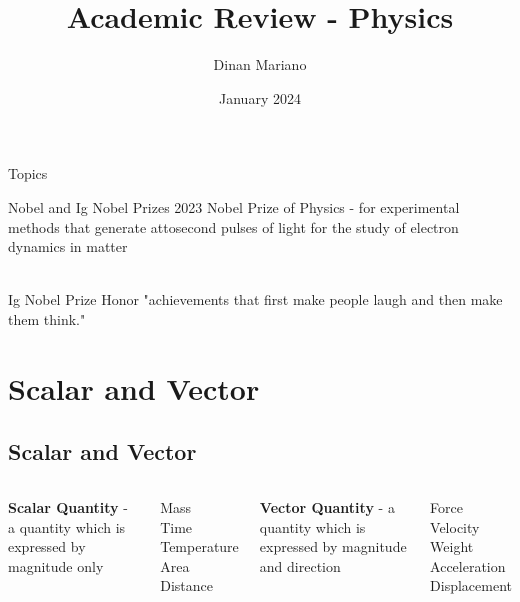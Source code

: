 \documentclass[aspectratio=169]{beamer}
\title{Academic Review - Physics}
\author{Dinan Mariano}
\institute{UP Mindoreños}
\date{January 2024}
\begin{document}
	
	
\begin{frame}
    \maketitle
\end{frame}

\begin{frame}{Topics}
	\tableofcontents

\end{frame}

\begin{frame}{Nobel and Ig Nobel Prizes}
	2023 Nobel Prize of Physics - for experimental methods that generate attosecond pulses of light for the study of electron dynamics in matter\\~\\
	\uncover<2-> {
	\begin{block}{Ig Nobel Prize}
		Honor "achievements that first make people laugh and then make them think."
	\end{block}}
	
\end{frame}

\section{Scalar and Vector}

\subsection{Scalar and Vector}

\begin{frame}
	\begin{columns}
		 \textbf{Scalar Quantity} - a quantity which is expressed by magnitude only \\
		\begin{example}
			Mass \\
			Time \\
			Temperature \\
			Area \\
			Distance 
		\end{example}
		 \textbf{Vector Quantity} - a quantity which is expressed by magnitude and direction \\
		\begin{example}
			Force \\
			Velocity \\
			Weight \\
			Acceleration \\
			Displacement
		\end{example}
	\end{columns}
\end{frame}
\end{document}
